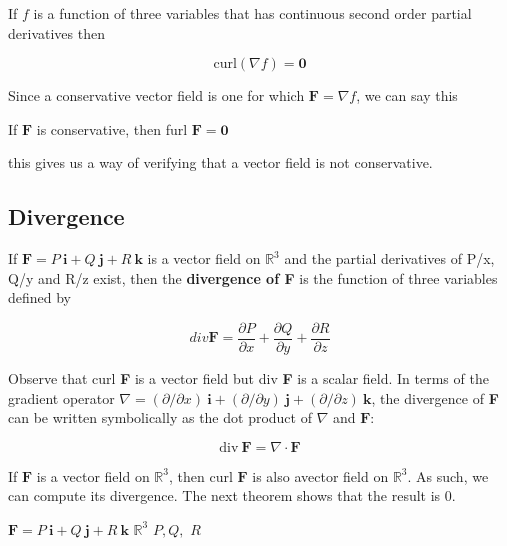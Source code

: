 \documentclass{article}
\begin{document}
If $f$ is a function of three variables that has continuous second order partial derivatives then 

\begin{equation*}
    \text{curl}(\nabla f) = \mathbf{0}
\end{equation*}

Since a conservative vector field is one for which $\mathbf{F} = \nabla f$, we can say this

\begin{center}
    If $\mathbf{F}$ is conservative, then furl $\mathbf{F} = \mathbf{0}$
\end{center}

this gives us a way of verifying that a vector field is not conservative.

\subsection{Divergence}

If $\mathbf{F} = P \ \mathbf{i} + Q \ \mathbf{j} + R \ \mathbf{k} $ is a vector field on $\mathbb{R}^3$ and the partial derivatives of P/x, Q/y and R/z exist, then the \textbf{divergence of F} is the function of three variables defined by 

\begin{equation*}
    div \mathbf{F} = \frac{\partial P}{\partial x} + \frac{\partial Q}{\partial y} + \frac{\partial R}{\partial z}
\end{equation*}

Observe that curl \textbf{F} is a vector field but div \textbf{F} is a scalar field. In terms of the gradient operator $\nabla = (\partial/\partial x) \ \mathbf{i} + (\partial / \partial y) \ \mathbf{j}+ (\partial / \partial z) \ \mathbf{k}$, the divergence of \textbf{F} can be written symbolically as the dot product of $\nabla$ and $\mathbf{F}$:

\begin{equation*}
    \text{div} \  \mathbf{F} = \nabla \cdot \mathbf{F}
\end{equation*}

If $\mathbf{F}$ is a vector field on $\mathbb{R}^3$, then curl $\mathbf{F}$ is also avector field on $\mathbb{R}^3$. As such, we can compute its divergence. The next theorem shows that the result is 0.

\begin{center}
     $\mathbf{F} = P \ \mathbf{i} + Q \ \mathbf{j} + R \ \mathbf{k}$  $\mathbb{R}^3 $  $P, Q, $ $R $ 
\end{center}
\end{document}
